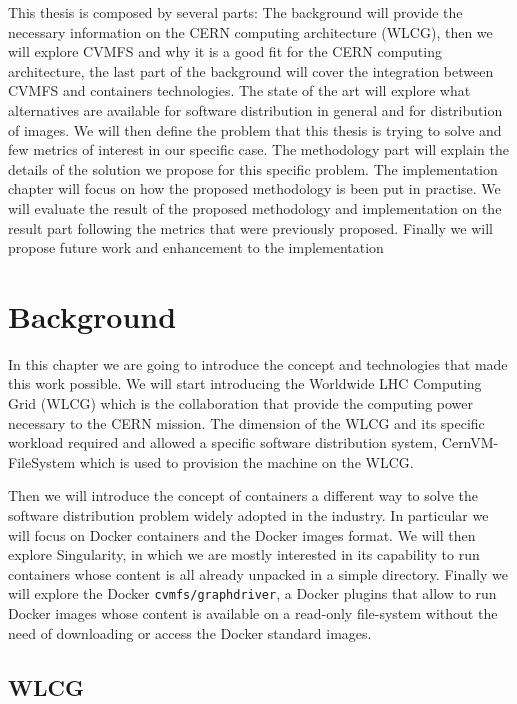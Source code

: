 This thesis is composed by several parts: The background will provide the
necessary information on the CERN computing architecture (WLCG), then we will
explore CVMFS and why it is a good fit for the CERN computing architecture, the
last part of the background will cover the integration between CVMFS and
containers technologies.  The state of the art will explore what alternatives
are available for software distribution in general and for distribution of
images.  We will then define the problem that this thesis is trying to solve
and few metrics of interest in our specific case.  The methodology part will
explain the details of the solution we propose for this specific problem.  The
implementation chapter will focus on how the proposed methodology is been put
in practise.  We will evaluate the result of the proposed methodology and
implementation on the result part following the metrics that were previously
proposed.  Finally we will propose future work and enhancement to the
implementation

\chapter{Background}\label{ch:background}

In this chapter we are going to introduce the concept and technologies that
made this work possible.  We will start introducing the Worldwide LHC Computing
Grid (WLCG) which is the collaboration that provide the computing power
necessary to the CERN mission. The dimension of the WLCG and its specific
workload required and allowed a specific software distribution system,
CernVM-FileSystem which is used to provision the machine on the WLCG.

Then we will introduce the concept of containers a different way to solve the
software distribution problem widely adopted in the industry. In particular we
will focus on Docker containers and the Docker images format. We will then
explore Singularity, in which we are mostly interested in its capability to run
containers whose content is all already unpacked in a simple directory. Finally
we will explore the Docker \texttt{cvmfs/graphdriver}, a Docker plugins that
allow to run Docker images whose content is available on a read-only
file-system without the need of downloading or access the Docker standard
images.


\section{WLCG}

